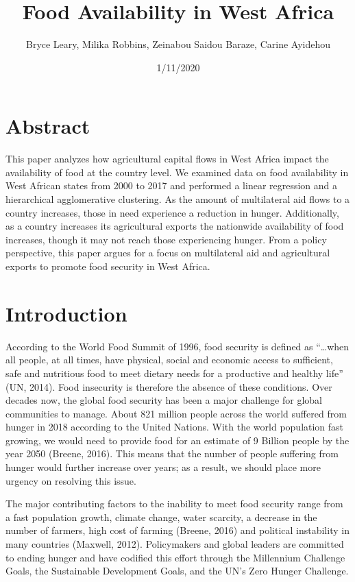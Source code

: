 \documentclass[
]{article}
\title{Food Availability in West Africa}
\author{Bryce Leary, Milika Robbins, Zeinabou Saidou Baraze, Carine Ayidehou}
\date{1/11/2020}
\begin{document}
\maketitle

\hypertarget{abstract}{%
\section{Abstract}\label{abstract}}

This paper analyzes how agricultural capital flows in West Africa impact
the availability of food at the country level. We examined data on food
availability in West African states from 2000 to 2017 and performed a
linear regression and a hierarchical agglomerative clustering. As the
amount of multilateral aid flows to a country increases, those in need
experience a reduction in hunger. Additionally, as a country increases
its agricultural exports the nationwide availability of food increases,
though it may not reach those experiencing hunger. From a policy
perspective, this paper argues for a focus on multilateral aid and
agricultural exports to promote food security in West Africa.

\hypertarget{introduction}{%
\section{Introduction}\label{introduction}}

According to the World Food Summit of 1996, food security is defined as
``\ldots when all people, at all times, have physical, social and
economic access to sufficient, safe and nutritious food to meet dietary
needs for a productive and healthy life'' (UN, 2014). Food insecurity is
therefore the absence of these conditions. Over decades now, the global
food security has been a major challenge for global communities to
manage. About 821 million people across the world suffered from hunger
in 2018 according to the United Nations. With the world population fast
growing, we would need to provide food for an estimate of 9 Billion
people by the year 2050 (Breene, 2016). This means that the number of
people suffering from hunger would further increase over years; as a
result, we should place more urgency on resolving this issue.

The major contributing factors to the inability to meet food security
range from a fast population growth, climate change, water scarcity, a
decrease in the number of farmers, high cost of farming (Breene, 2016)
and political instability in many countries (Maxwell, 2012).
Policymakers and global leaders are committed to ending hunger and have
codified this effort through the Millennium Challenge Goals, the
Sustainable Development Goals, and the UN's Zero Hunger Challenge.
\end{document}
